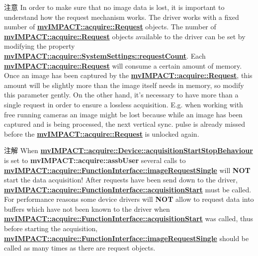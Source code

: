 \begin{DoxyAttention}{注意}
In order to make sure that no image data is lost, it is important to understand how the request mechanism works. The driver works with a fixed number of {\bfseries \hyperlink{classmv_i_m_p_a_c_t_1_1acquire_1_1_request}{mv\+I\+M\+P\+A\+C\+T\+::acquire\+::\+Request}} objects. The number of {\bfseries \hyperlink{classmv_i_m_p_a_c_t_1_1acquire_1_1_request}{mv\+I\+M\+P\+A\+C\+T\+::acquire\+::\+Request}} objects available to the driver can be set by modifying the property {\bfseries \hyperlink{classmv_i_m_p_a_c_t_1_1acquire_1_1_system_settings_aebae5e452b01f037b681faca41fb70ac}{mv\+I\+M\+P\+A\+C\+T\+::acquire\+::\+System\+Settings\+::request\+Count}}. Each {\bfseries \hyperlink{classmv_i_m_p_a_c_t_1_1acquire_1_1_request}{mv\+I\+M\+P\+A\+C\+T\+::acquire\+::\+Request}} will consume a certain amount of memory. Once an image has been captured by the {\bfseries \hyperlink{classmv_i_m_p_a_c_t_1_1acquire_1_1_request}{mv\+I\+M\+P\+A\+C\+T\+::acquire\+::\+Request}}, this amount will be slightly more than the image itself needs in memory, so modify this parameter gently. On the other hand, it's necessary to have more than a single request in order to ensure a lossless acquisition. E.\+g. when working with free running cameras an image might be lost because while an image has been captured and is being processed, the next vertical sync. pulse is already missed before the {\bfseries \hyperlink{classmv_i_m_p_a_c_t_1_1acquire_1_1_request}{mv\+I\+M\+P\+A\+C\+T\+::acquire\+::\+Request}} is unlocked again.
\end{DoxyAttention}
\begin{DoxyNote}{注解}
When {\bfseries \hyperlink{classmv_i_m_p_a_c_t_1_1acquire_1_1_device_aa5cdb4615de973bbf1c24f2fd5a3d1b5}{mv\+I\+M\+P\+A\+C\+T\+::acquire\+::\+Device\+::acquisition\+Start\+Stop\+Behaviour}} is set to {\bfseries mv\+I\+M\+P\+A\+C\+T\+::acquire\+::assb\+User} several calls to {\bfseries \hyperlink{classmv_i_m_p_a_c_t_1_1acquire_1_1_function_interface_a59571120b5e81c3af596ea5da5dc63ba}{mv\+I\+M\+P\+A\+C\+T\+::acquire\+::\+Function\+Interface\+::image\+Request\+Single}} will {\bfseries N\+O\+T} start the data acquisition! After requests have been send down to the driver, {\bfseries \hyperlink{classmv_i_m_p_a_c_t_1_1acquire_1_1_function_interface_a91750ec88416ca6557b1bbb10ebc5039}{mv\+I\+M\+P\+A\+C\+T\+::acquire\+::\+Function\+Interface\+::acquisition\+Start}} must be called. For performance reasons some device drivers will {\bfseries N\+O\+T} allow to request data into buffers which have not been known to the driver when {\bfseries \hyperlink{classmv_i_m_p_a_c_t_1_1acquire_1_1_function_interface_a91750ec88416ca6557b1bbb10ebc5039}{mv\+I\+M\+P\+A\+C\+T\+::acquire\+::\+Function\+Interface\+::acquisition\+Start}} was called, thus before starting the acquisition, {\bfseries \hyperlink{classmv_i_m_p_a_c_t_1_1acquire_1_1_function_interface_a59571120b5e81c3af596ea5da5dc63ba}{mv\+I\+M\+P\+A\+C\+T\+::acquire\+::\+Function\+Interface\+::image\+Request\+Single}} should be called as many times as there are request objects. 
\end{DoxyNote}
